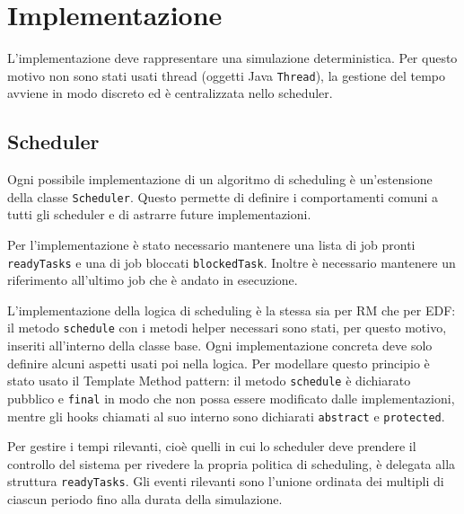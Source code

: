 \chapter{Implementazione}
\label{cap:implementazione}
L'implementazione deve rappresentare una simulazione deterministica. Per questo motivo non sono stati usati thread (oggetti Java \texttt{Thread}), la gestione del tempo avviene in modo discreto ed è centralizzata nello scheduler.

\section{Scheduler}
Ogni possibile implementazione di un algoritmo di scheduling è un'estensione della classe \texttt{Scheduler}. Questo permette di definire i comportamenti comuni a tutti gli scheduler e di astrarre future implementazioni.

Per l'implementazione è stato necessario mantenere una lista di job pronti \texttt{readyTasks} e una di job bloccati \texttt{blockedTask}. Inoltre è necessario mantenere un riferimento all'ultimo job che è andato in esecuzione.

\myskip

L'implementazione della logica di scheduling è la stessa sia per RM che per EDF: il metodo \texttt{schedule} con i metodi helper necessari sono stati, per questo motivo, inseriti all'interno della classe base. Ogni implementazione concreta deve solo definire alcuni aspetti usati poi nella logica. Per modellare questo principio è stato usato il Template Method pattern: il metodo \texttt{schedule} è dichiarato pubblico e \texttt{final} in modo che non possa essere modificato dalle implementazioni, mentre gli hooks chiamati al suo interno sono dichiarati \texttt{abstract} e \texttt{protected}.

Per gestire i tempi rilevanti, cioè quelli in cui lo scheduler deve prendere il controllo del sistema per rivedere la propria politica di scheduling, è delegata alla struttura \texttt{readyTasks}. Gli eventi rilevanti sono l'unione ordinata dei multipli di ciascun periodo fino alla durata della simulazione.


